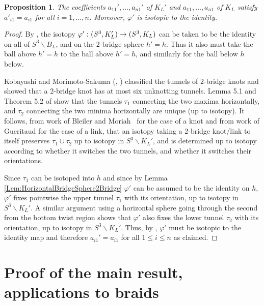 \documentclass[12pt,reqno]{amsart}
\theoremstyle{plain}
\newtheorem{proposition}[theorem]{Proposition}
\theoremstyle{definition}
\def\from{\thinspace\colon}
\newcommand{\ssm}{\smallsetminus}
\begin{document}
\begin{proposition}\label{Prop:Coeffs2Bridge}
The coefficients $a_{11}',\dots,a_{n1}'$ of $K_L'$ and $a_{11},\dots,a_{n1}$ 
of $K_L$ satisfy $a'_{i1}=a_{i1}$  for all $i=1,\dots,n$. Moreover,
$\varphi'$ is isotopic to the identity. 
\end{proposition}

\begin{proof}
By , the isotopy $\varphi'\from 
(S^3,K_L')\to (S^3,K_L)$ can be taken to be the identity on all 
of $S^3\ssm B_L$, and on the 2-bridge sphere $h'=h$. Thus it also 
must take the ball above $h'=h$ to the ball above $h'=h$, and similarly
for the ball below $h$ below. 

Kobayashi and Morimoto-Sakuma (\cite{Kobayashi}, \cite{MorimotoSakuma}) classified the 
tunnels of $2$-bridge knots and showed that a 2-bridge knot has at most six 
unknotting tunnels. Lemma 5.1 and Theorem 5.2 of \cite{MorimotoSakuma} show that
the tunnels $\tau_1$ connecting  the two maxima horizontally, and  $\tau_2$ connecting
the two minima horizontally are unique  (up to isotopy). It follows, from work of Bleiler 
and Moriah~\cite{BleilerMoriah} for the case of a knot and from work of Gueritaud 
\cite{Gueritaud2006Canonical} for the case  of a link, that an isotopy taking a 2-bridge
knot/link to itself preserves $\tau_1\cup\tau_2$ up to isotopy in $S^3\ssm K_L'$, and 
is determined up to isotopy according to whether it switches the two tunnels, and whether 
it switches their orientations.

Since $\tau_1$ can be isotoped into $h$ and since by Lemma \ref {Lem:HorizontalBridgeSphere2Bridge}
$\varphi'$ can be  assumed to be the identity on $h$,  $\varphi'$ fixes pointwise the
upper tunnel $\tau_1$ with its orientation, up to isotopy in $S^3\ssm K_L'$. A similar
argument using a horizontal sphere going through the second from the bottom twist region  
shows that $\varphi'$ also fixes the lower tunnel $\tau_2$ with its orientation, up to
isotopy in $S^3\ssm K_L'$. Thus, by \cite{BleilerMoriah, Gueritaud2006Canonical}, $\varphi'$ must be
isotopic to the identity map and therefore $a_{i1} '= a_{i1} $ for all $1\le i \le n$ as claimed.
\end{proof}

\vskip15pt

\section{Proof of the main result, applications to braids}
\label{sec:Applications}
\end{document}
